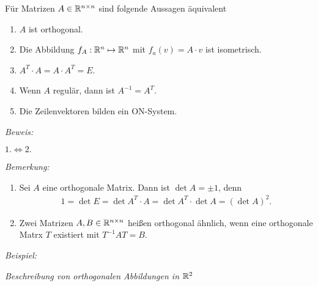 \begin{mysatz}\label{orthogonaleMatrix}
    Für Matrizen $A\in \mathbb{R}^{n \times n}$ sind folgende Aussagen äquivalent
    \begin{enumerate}
        \item $A$ ist orthogonal.
        \item Die Abbildung $f_A : \mathbb{R}^n \mapsto \mathbb{R}^n$ mit $f_a(v) = A \cdot v$ ist isometrisch.
        \item \label{oM-3} $A^T \cdot A = A \cdot A^T = E$.
        \item Wenn $A$ regulär, dann ist $A^{-1} = A^T$.
        \item Die Zeilenvektoren bilden ein ON-System.
    \end{enumerate}

    \textit{Beweis:}\medskip

    $1.\Leftrightarrow 2.$
\end{mysatz}


\textit{Bemerkung:}
\begin{enumerate}
    \item Sei $A$ eine orthogonale Matrix. Dann ist $\det A = \pm 1$, denn
        \begin{align*}
            1 = \det E = \det A^T \cdot A = \det A^T \cdot \det A = (\det A)^2.
        \end{align*}
    \item Zwei Matrizen $A, B \in \mathbb{R}^{n \times n}$ heißen orthogonal ähnlich, wenn eine orthogonale Matrx $T$ existiert mit $T^{-1} A T = B$.
\end{enumerate}



\textit{Beispiel:}\medskip

\textit{Beschreibung von orthogonalen Abbildungen in $\mathbb{R}^2$}

